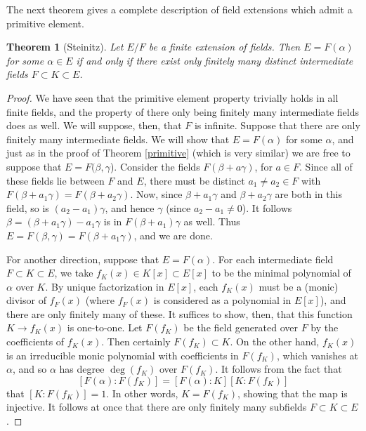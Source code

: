 \documentclass[12pt]{report}
\newtheorem{thm}{Theorem}[section]
\theoremstyle{definition}
\def\aa{\alpha}
\def\bb{\beta}
\begin{document}
The next theorem gives a complete description of field extensions which admit a primitive
element.

\begin{thm}[Steinitz]\label{ste}
    Let $E/F$ be a finite extension of fields. Then $E = F(\aa)$ for some $\aa \in E$ if and only if there exist only finitely many distinct intermediate fields $F \subset K \subset E$.
\end{thm}

\begin{proof}
    We have seen that the primitive element property trivially holds in all finite fields, and the property of there only being finitely many intermediate fields does as well. We will suppose, then, that $F$ is infinite.
    Suppose that there are only finitely many intermediate fields. We will show that $E = F(\aa)$ for some $\aa$, and just as in the proof of Theorem \ref{primitive} (which is very similar) we are free to suppose that $E = F(\bb,\gamma$). Consider the fields $F(\bb + a\gamma)$, for $a \in F$. Since all of these fields lie between $F$ and $E$, there must be distinct $a_1 \not= a_2 \in F$ with $F(\bb + a_1 \gamma) = F(\bb + a_2\gamma)$. Now, since $\bb + a_1 \gamma$ and $\bb + a_2 \gamma$ are both in this field, so is $(a_2 - a_1)\gamma$, and hence $\gamma$ (since $a_2 - a_1 \not= 0$). It follows $\beta = (\beta+a_1\gamma) -a_1\gamma$ is in $F(\beta +a_1)\gamma$ as well. Thus $E = F(\bb,\gamma) = F(\bb + a_1\gamma)$, and we are done.

    For another direction, suppose that $E = F(\aa)$. For each intermediate field $F \subset K \subset E$, we take $f_K(x) \in K[x] \subset E[x]$ to be the minimal polynomial of $\aa$ over $K$. By unique factorization in $E[x]$, each $f_K(x)$ must be a (monic) divisor of $f_F(x)$ (where $f_F(x)$ is considered as a polynomial in $E[x]$), and there are only finitely many of these. It suffices to show, then, that this function $K \to f_K(x)$ is one-to-one. Let $F(f_K)$ be the field generated over $F$ by the coefficients of $f_K(x)$. Then certainly $F(f_K) \subset K$. On the other hand, $f_K(x)$ is an irreducible monic polynomial with coefficients in $F(f_K)$, which vanishes at $\aa$, and so $\aa$ has degree $\deg(f_K)$ over $F(f_K)$. It follows from the fact that
   $$[F(\aa):F(f_K)] = [F(\aa):K][K:F(f_K)]$$ that $[K : F(f_K)] = 1$. In other words, $K = F(f_K)$, showing that the map is injective. It follows at once that there are only finitely many subfields $F \subset K \subset E$.    
\end{proof}
\end{document}
